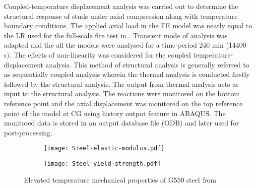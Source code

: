 Coupled-temperature displacement analysis was carried out to determine the structural response of studs under axial compression along with temperature boundary conditions. The applied axial load in the FE model was nearly equal to the LR used for the full-scale fire test in . Transient mode of analysis was adapted and the all the models were analysed for a time-period 240 min (14400 s). The effects of non-linearity was considered for the coupled temperature-displacement analysis. This method of structural analysis is generally referred to as sequentially coupled analysis wherein the thermal analysis is conducted firstly followed by the structural analysis. The output from thermal analysis acts as input to the structural analysis. The reactions were monitored on the bottom reference point and the axial displacement was monitored on the top reference point of the model at CG using history output feature in ABAQUS. The monitored data is stored in an output database file (ODB) and later used for post-processing. 
\begin{figure}[!htbp]
	\centering
	\begin{subfigure}[b]{0.45\textwidth}
		\centering
		\texttt{[image: Steel-elastic-modulus.pdf]}
		\caption{}
		\label{subfig:Steel-elastic-modulus}
	\end{subfigure}
	\begin{subfigure}[b]{0.45\textwidth}
		\centering
		\texttt{[image: Steel-yield-strength.pdf]}
		\caption{}
		\label{subfig:Steel-yield strength}
	\end{subfigure}
	   \caption{Elevated temperature mechanical properties of G550 steel from \citet{Kankanamge2011}}
	   \label{fig:steel-elevated-mechanical}
\end{figure} 

